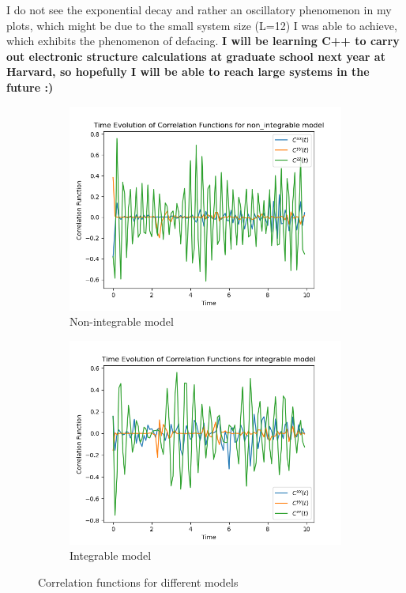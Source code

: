 \documentclass[12pt]{article}
\begin{document}
I do not see the exponential decay and rather an oscillatory phenomenon in my plots, which might be due to the small system size (L=12) I was able to achieve, which exhibits the phenomenon of defacing. \textbf{I will be learning C++ to carry out electronic structure calculations at graduate school next year at Harvard, so hopefully I will be able to reach large systems in the future :)}
\begin{figure}
    \centering
    \begin{subfigure}[b]{0.4\textwidth}
        \includegraphics[width=\textwidth]{non_integrable_correlation_functions.png}
        \caption{Non-integrable model}
    \end{subfigure}
    \hfill
    \begin{subfigure}[b]{0.4\textwidth}
        \includegraphics[width=\textwidth]{integrable_correlation_functions.png}
        \caption{Integrable model}
    \end{subfigure}
    \caption{Correlation functions for different models}
\end{figure}
\end{document}
